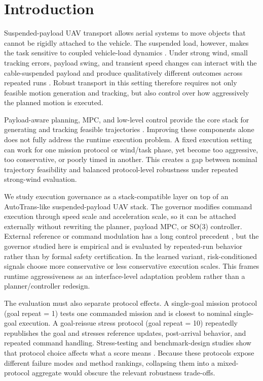 \section{Introduction}

Suspended-payload UAV transport allows aerial systems to move objects that
cannot be rigidly attached to the vehicle. The suspended load, however, makes
the task sensitive to coupled vehicle-load dynamics
\cite{Sreenath2013DifferentiallyFlatHybrid,Li2023AutoTrans}. Under strong wind,
small tracking errors, payload swing, and transient speed changes can interact
with the cable-suspended payload and produce qualitatively different outcomes
across repeated runs \cite{Son2020ObstacleAvoidanceSuspendedLoad,GuerreroSanchez2017SwingAttenuation}.
Robust transport in this setting therefore requires not only feasible motion
generation and tracking, but also control over how aggressively the planned
motion is executed.

Payload-aware planning, MPC, and low-level control provide the core stack for
generating and tracking feasible trajectories
\cite{Li2023AutoTrans,Son2020ObstacleAvoidanceSuspendedLoad,UrbinaBrito2021PredictivePayloadTransport,Lee2010GeometricTrackingSE3}.
Improving these components alone does not fully address the runtime execution
problem. A fixed execution setting can work for one mission protocol or
wind/task phase, yet become too aggressive, too conservative, or poorly timed in
another. This creates a gap between nominal trajectory feasibility and balanced
protocol-level robustness under repeated strong-wind evaluation.

We study execution governance as a stack-compatible layer on top of an
AutoTrans-like suspended-payload UAV stack. The governor modifies command
execution through speed scale and acceleration scale, so it can be attached
externally without rewriting the planner, payload MPC, or SO(3) controller.
External reference or command modulation has a long control precedent
\cite{Garone2017ReferenceCommandGovernorsSurvey,Garone2016ExplicitReferenceGovernor,Li2021ActionGovernor},
but the governor studied here is empirical and is evaluated by repeated-run
behavior rather than by formal safety certification. In the learned variant,
risk-conditioned signals choose more conservative or less conservative
execution scales. This frames runtime aggressiveness as an interface-level
adaptation problem rather than a planner/controller redesign.

The evaluation must also separate protocol effects. A single-goal mission
protocol (goal repeat = 1) tests one commanded mission and is closest to
nominal single-goal execution. A goal-reissue stress protocol
(goal repeat = 10) repeatedly republishes the goal and stresses reference
updates, post-arrival behavior, and repeated command handling. Stress-testing
and benchmark-design studies show that protocol choice affects what a score
means \cite{Koren2018AdaptiveStressTesting,Nalic2020StressTestingScenarioBasedADS,Muller2019MeasureTargetConfusion}.
Because these protocols expose different failure modes and method rankings,
collapsing them into a mixed-protocol aggregate would obscure the relevant
robustness trade-offs.

